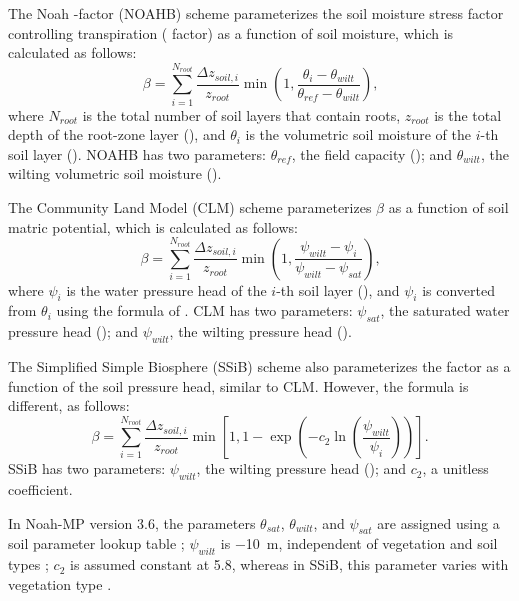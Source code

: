 \documentclass[essd, manuscript]{copernicus}
\let\unit\undefined
\begin{document}
The Noah \beta{}-factor (NOAHB) scheme parameterizes the soil moisture stress factor controlling transpiration (\beta{} factor) as a function of soil moisture, which is calculated as follows:
\begin{equation}
  \beta = \sum_{i=1}^{N_{root}} \frac{\Delta z_{soil,i}}{z_{root}}
  \min(1, \frac{\theta_i - \theta_{wilt}}{\theta_{ref} - \theta_{wilt}})
  \text{,}
\end{equation}
where \(N_{root}\) is the total number of soil layers that contain roots, \(z_{root}\) is the total depth of the root-zone layer (\unit{m}), and \(\theta_i\) is the volumetric soil moisture of the \(i\)-th soil layer (\unit{m^3.m^{-3}}). NOAHB has two parameters: \(\theta_{ref}\), the field capacity (\unit{m^3.m^{-3}}); and \(\theta_{wilt}\), the wilting volumetric soil moisture (\unit{m^3.m^{-3}}).

The Community Land Model (CLM) scheme \citep{oleson2004} parameterizes \(\beta\) as a function of soil matric potential, which is calculated as follows:
\begin{equation}
  \beta = \sum_{i=1}^{N_{root}} \frac{\Delta z_{soil,i}}{z_{root}}
  \min(1, \frac{\psi_{wilt} - \psi_i}{\psi_{wilt} - \psi_{sat}})
  \text{,}
\end{equation}
where \(\psi_i\) is the water pressure head of the \(i\)-th soil layer (\unit{m}), and \(\psi_i\) is converted from \(\theta_i\) using the formula of \citet{clapp1978WRR}. CLM has two parameters: \(\psi_{sat}\), the saturated water pressure head (\unit{m}); and \(\psi_{wilt}\), the wilting pressure head (\unit{m}).

The Simplified Simple Biosphere (SSiB) scheme \citep{xue1991JC} also parameterizes the \beta{} factor as a function of the soil pressure head, similar to CLM\@. However, the formula is different, as follows:
\begin{equation}
  \beta = \sum_{i=1}^{N_{root}} \frac{\Delta z_{soil,i}}{z_{root}}
  \min\left[1, 1 - \exp\left(-c_2 \ln(\frac{\psi_{wilt}}{\psi_{i}})\right)\right]
  \text{.}
\end{equation}
SSiB has two parameters: \(\psi_{wilt}\), the wilting pressure head (\unit{m}); and \(c_2\), a unitless coefficient.

In Noah-MP version 3.6, the parameters \(\theta_{sat}\), \(\theta_{wilt}\), and \(\psi_{sat}\) are assigned using a soil parameter lookup table \citep[Table 2]{chen2001MWR}; \(\psi_{wilt}\) is \qty{-10}{m}, independent of vegetation and soil types \citep{niu2011JGRA}; \(c_2\) is assumed constant at \num{5.8}, whereas in SSiB, this parameter varies with vegetation type \citep[Table 2]{xue1991JC}.
\end{document}

